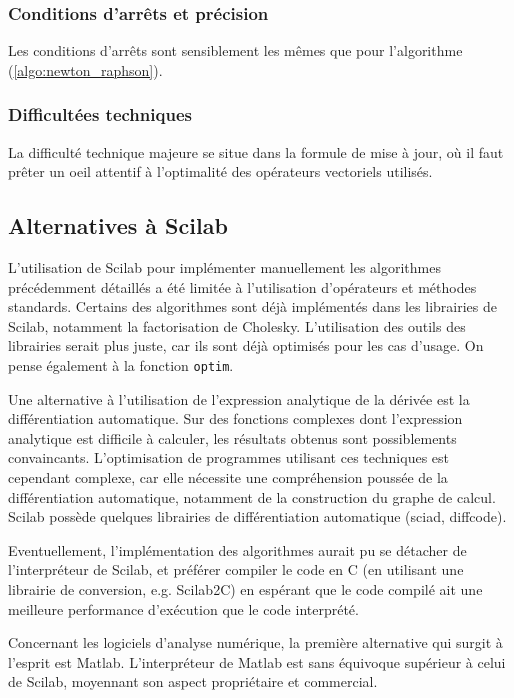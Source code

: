 \documentclass[3p, twocolumn]{elsarticle}
\begin{document}
\subsubsection{Conditions d'arrêts et précision}
Les conditions d'arrêts sont sensiblement les mêmes que pour l'algorithme (\ref{algo:newton_raphson}).

\subsubsection{Difficultées techniques}
La difficulté technique majeure se situe dans la formule de mise à jour, où il faut prêter un oeil attentif à l'optimalité des opérateurs vectoriels utilisés.

\subsection{Alternatives à Scilab}

L'utilisation de Scilab pour implémenter manuellement les algorithmes précédemment détaillés a été limitée à l'utilisation d'opérateurs et méthodes standards. Certains des algorithmes sont déjà implémentés dans les librairies de Scilab, notamment la factorisation de Cholesky. L'utilisation des outils des librairies serait plus juste, car ils sont déjà optimisés pour les cas d'usage. On pense également à la fonction \texttt{optim}.

Une alternative à l'utilisation de l'expression analytique de la dérivée est la différentiation automatique. Sur des fonctions complexes dont l'expression analytique est difficile à calculer, les résultats obtenus sont possiblements convaincants. L'optimisation de programmes utilisant ces techniques est cependant complexe, car elle nécessite une compréhension poussée de la différentiation automatique, notamment de la construction du graphe de calcul. Scilab possède quelques librairies de différentiation automatique (sciad, diffcode). 

Eventuellement, l'implémentation des algorithmes aurait pu se détacher de l'interpréteur de Scilab, et préférer compiler le code en C (en utilisant une librairie de conversion, e.g. Scilab2C) en espérant que le code compilé ait une meilleure performance d'exécution que le code interprété.

Concernant les logiciels d'analyse numérique, la première alternative qui surgit à l'esprit est Matlab. L'interpréteur de Matlab est sans équivoque supérieur à celui de Scilab, moyennant son aspect propriétaire et commercial.
\end{document}
